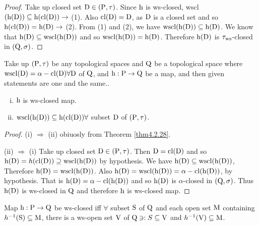 \begin{proof}
Take up closed set $\mathrm{D} \in (\mathrm{P}, \tau)$. Since $\mathrm{h}$ is ws-closed, wscl $(\mathrm{h} (\mathrm{D})) \subseteq \mathrm{h} (\mathrm{cl} (\mathrm{D})) \to$ (1). Also $\mathrm{cl} (\mathrm{D}) = \mathrm{D}$, as $\mathrm{D}$ is a closed set and so $\mathrm{h} (\mathrm{cl}(\mathrm{D})) = \mathrm{h}(\mathrm{D}) \to$ (2). From (1) and (2), we have $\mathrm{wscl} (\mathrm{h} (\mathrm{D})) \subseteq \mathrm{h} (\mathrm{D})$. We know that $\mathrm{h} (\mathrm{D}) \subseteq \mathrm{ws} \mathrm{cl} (\mathrm{h} (\mathrm{D}))$ and so $\mathrm{wscl} (\mathrm{h} (\mathrm{D})) =\mathrm{h} (\mathrm{D})$. Therefore $\mathrm{h} (\mathrm{D})$ is $\tau_{\mathrm{ws}}$-closed in $(\mathrm{Q}, \sigma)$.
\end{proof}

\begin{thm}\label{thm4.2.30}
Take up $(\mathrm{P}, \tau)$ be any topological spaces and $\mathrm{Q}$ be a topological space where $\mathrm{wscl} (\mathrm{D}) = \alpha - \mathrm{cl} (\mathrm{D}) \forall \mathrm{D}$ of $\mathrm{Q}$, and $\mathrm{h}: \mathrm{P} \to \mathrm{Q}$ be a map, and then given statements are one and the same..
\begin{enumerate}[(i)]
\item $\mathrm{h}$ is ws-closed map.
\item $\mathrm{wscl} (\mathrm{h} (\mathrm{D})) \subseteq \mathrm{h} (\mathrm{cl} (\mathrm{D})) \forall$ subset $\mathrm{D}$ of $(\mathrm{P}, \tau)$.
\end{enumerate}
\end{thm}

\begin{proof}
(i) $\Rightarrow$ (ii) obiuosly from Theorem \ref{thm4.2.28}.

(ii) $\Rightarrow$ (i) Take up closed set $\mathrm{D} \in (\mathrm{P}, \tau)$. Then $\mathrm{D}=\mathrm{cl} (\mathrm{D})$ and so $\mathrm{h}(\mathrm{D}) = h(\mathrm{cl} (\mathrm{D})) \supseteq \mathrm{wscl} (\mathrm{h} (\mathrm{D}))$ by hypothesis. We have $\mathrm{h} (\mathrm{D}) \subseteq \mathrm{wscl} (\mathrm{h} (\mathrm{D}))$, Therefore $\mathrm{h} (\mathrm{D}) = \mathrm{wscl} (\mathrm{h} (\mathrm{D}))$. Also $\mathrm{h} (\mathrm{D}) = \mathrm{wscl} (\mathrm{h} (\mathrm{D})) = \alpha-\mathrm{cl} (\mathrm{h} (\mathrm{D}))$, by hypothesis. That is $\mathrm{h} (\mathrm{D}) = \alpha-\mathrm{cl} (\mathrm{h} (\mathrm{D}))$ and so $\mathrm{h} (\mathrm{D})$ is $\alpha$-closed in $(\mathrm{Q}, \sigma)$. Thus $\mathrm{h} (\mathrm{D})$ is ws-closed in $\mathrm{Q}$ and therefore $\mathrm{h}$ is ws-closed map.
\end{proof}

\begin{thm}\label{thm4.2.31}
Map $\mathrm{h} : \mathrm{P} \to \mathrm{Q}$ be ws-closed iff $\forall$ subset $\mathrm{S}$ of $\mathrm{Q}$ and each open set $\mathrm{M}$ containing $h^{-1}(\mathrm{S}) \subseteq \mathrm{M}$, there is a ws-open set $\mathrm{V}$ of $\mathrm{Q} \ni: S \subseteq \mathrm{V}$ and $h^{-1} (\mathrm{V}) \subseteq \mathrm{M}$.
\end{thm}


